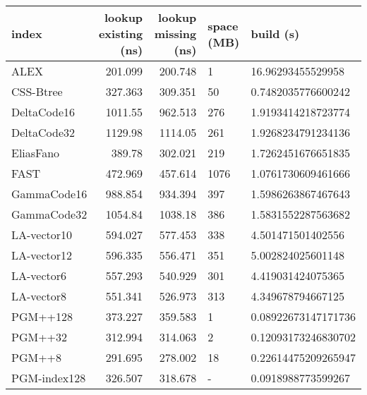 \begin{tabular}{lrrll}
\hline
 index             &   lookup existing (ns) &   lookup missing (ns) & space (MB)   & build (s)             \\
\hline
 ALEX              &                201.099 &               200.748 & 1            & 16.96293455529958     \\
 CSS-Btree         &                327.363 &               309.351 & 50           & 0.7482035776600242    \\
 DeltaCode16       &               1011.55  &               962.513 & 276          & 1.9193414218723774    \\
 DeltaCode32       &               1129.98  &              1114.05  & 261          & 1.9268234791234136    \\
 EliasFano         &                389.78  &               302.021 & 219          & 1.7262451676651835    \\
 FAST              &                472.969 &               457.614 & 1076         & 1.0761730609461666    \\
 GammaCode16       &                988.854 &               934.394 & 397          & 1.5986263867467643    \\
 GammaCode32       &               1054.84  &              1038.18  & 386          & 1.5831552287563682    \\
 LA-vector10       &                594.027 &               577.453 & 338          & 4.501471501402556     \\
 LA-vector12       &                596.335 &               556.471 & 351          & 5.002824025601148     \\
 LA-vector6        &                557.293 &               540.929 & 301          & 4.419031424075365     \\
 LA-vector8        &                551.341 &               526.973 & 313          & 4.349678794667125     \\
 PGM++128          &                373.227 &               359.583 & 1            & 0.08922673147171736   \\
 PGM++32           &                312.994 &               314.063 & 2            & 0.12093173246830702   \\
 PGM++8            &                291.695 &               278.002 & 18           & 0.22614475209265947   \\
 PGM-index128      &                326.507 &               318.678 & -            & 0.0918988773599267    \\

\end{tabular}
